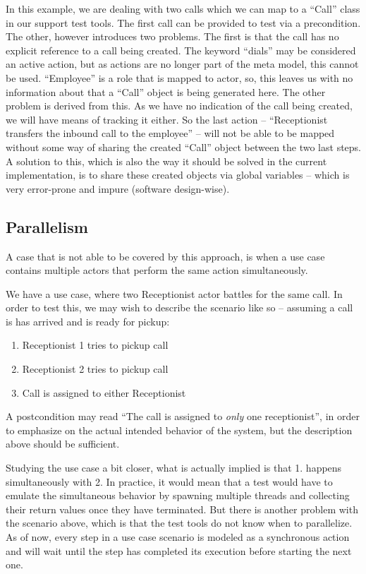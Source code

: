 In this example, we are dealing with two calls which we can map to a ``Call'' class in our support test tools. The first call can be provided to test via a precondition. The other, however introduces two problems. The first is that the call has no explicit reference to a call being created. The keyword ``dials'' may be considered an active action, but as actions are no longer part of the meta model, this cannot be used. ``Employee'' is a role that is mapped to actor, so, this leaves us with no information about that a ``Call'' object is being generated here. The other problem is derived from this. As we have no indication of the call being created, we will have means of tracking it either. So the last action -- ``Receptionist transfers the inbound call to the employee'' -- will not be able to be mapped without some way of sharing the created ``Call'' object between the two last steps.\medskip
A solution to this, which is also the way it should be solved in the current implementation, is to share these created objects via global variables -- which is very error-prone and impure (software design-wise).

\subsection{Parallelism}
\label{sec:parallelism}
A case that is not able to be covered by this approach, is when a use case contains multiple actors that perform the same action simultaneously.\medskip

\noindent We have a use case, where two Receptionist actor battles for the same call. In order to test this, we may wish to describe the scenario like so -- assuming a call is has arrived and is ready for pickup:
\begin{enumerate}
 \item Receptionist 1 tries to pickup call
 \item Receptionist 2 tries to pickup call
 \item Call is assigned to either Receptionist
\end{enumerate}
A postcondition may read ``The call is assigned to \emph{only} one receptionist'', in order to emphasize on the actual intended behavior of the system, but the description above should be sufficient.\medskip

\noindent Studying the use case a bit closer, what is actually implied is that 1. happens simultaneously with 2. In practice, it would mean that a test would have to emulate the simultaneous behavior by spawning multiple threads and collecting their return values once they have terminated. But there is another problem with the scenario above, which is that the test tools do not know when to parallelize. As of now, every step in a use case scenario is modeled as a synchronous action and will wait until the step has completed its execution before starting the next one.\medskip

